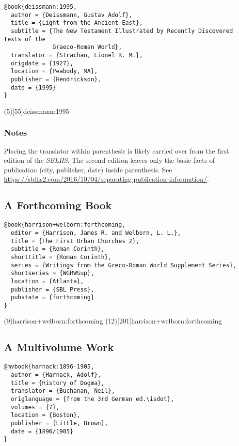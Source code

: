 \documentclass[a4paper]{article}
\begin{document}
\begin{verbatim}
@book{deissmann:1995,
  author = {Deissmann, Gustav Adolf},
  title = {Light from the Ancient East},
  subtitle = {The New Testament Illustrated by Recently Discovered Texts of the
              Graeco-Roman World},
  translator = {Strachan, Lionel R. M.},
  origdate = {1927},
  location = {Peabody, MA},
  publisher = {Hendrickson},
  date = {1995}
}
\end{verbatim}

\examplecite(5)[55]{deissmann:1995}
\examplebibliography

\subsubsection{Notes}

Placing the translator within parenthesis is likely carried over from the
first edition of the \emph{SBLHS}. The second edition leaves only the basic
facts of publication (city, publisher, date) inside parenthesis. See
\url{https://sblhs2.com/2016/10/04/separating-publication-information/}.

\subsection{A Forthcoming Book}

\begin{verbatim}
@book{harrison+welborn:forthcoming,
  editor = {Harrison, James R. and Welborn, L. L.},
  title = {The First Urban Churches 2},
  subtitle = {Roman Corinth},
  shorttitle = {Roman Corinth},
  series = {Writings from the Greco-Roman World Supplement Series},
  shortseries = {WGRWSup},
  location = {Atlanta},
  publisher = {SBL Press},
  pubstate = {forthcoming}
}
\end{verbatim}

\examplecite(9){harrison+welborn:forthcoming}
\examplecite(12)[201]{harrison+welborn:forthcoming}
\exampleabbreviations
\examplebibliography

\subsection{A Multivolume Work}

\begin{verbatim}
@mvbook{harnack:1896-1905,
  author = {Harnack, Adolf},
  title = {History of Dogma},
  translator = {Buchanan, Neil},
  origlanguage = {from the 3rd German ed.\isdot},
  volumes = {7},
  location = {Boston},
  publisher = {Little, Brown},
  date = {1896/1905}
}
\end{verbatim}
\end{document}
